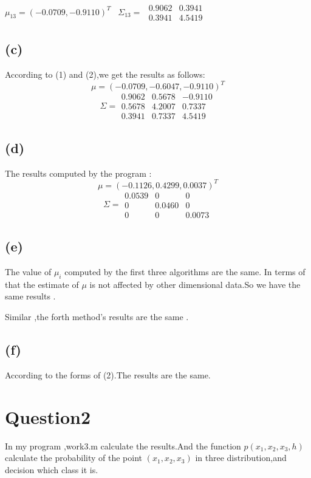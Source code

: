 \documentclass[10pt,a4paper]{article}
\begin{document}
	$\mu_{13}=(-0.0709,-0.9110)^T$ \ $\Sigma_{13}=$
	$\begin{array}{cc}
	0.9062& 0.3941  \\ 
	0.3941& 4.5419 
	\end{array} 
	$
	\subsection{(c)}
	According to (1) and (2),we get the results as follows:
	\begin{equation*}
	\mu=(-0.0709,-0.6047,-0.9110)^T
	\end{equation*}
	\begin{equation*}
	\Sigma=\begin{array}{ccc}
	0.9062& 0.5678  & -0.9110  \\ 
	0.5678& 4.2007 & 0.7337  \\ 
	0.3941& 0.7337  &4.5419 
	\end{array} 
	\end{equation*}
	\subsection{(d)}
	The results computed by the program :
	\begin{equation*}
	\mu=(-0.1126,0.4299,0.0037)^T
	\end{equation*}
	\begin{equation*}
	\Sigma=\begin{array}{ccc}
	0.0539& 0  & 0 \\ 
	0& 0.0460  & 0  \\ 
	0& 0 & 0.0073 
	\end{array} 
	\end{equation*}
	\subsection{(e)}
	The value of $\mu_i$ computed by the first three algorithms are the same.
	In terms of that the estimate of $\mu $ is not affected by other dimensional data.So we have the same results .
	
	Similar ,the forth method's results are the same .
	\subsection{(f)}
	According to the forms of (2).The results are the same.
\section{Question2}
In my program ,work3.m calculate the results.And the function $p(x_1,x_2,x_3,h)$ calculate the probability of  the point
 $(x_1,x_2,x_3)$ in three distribution,and decision which class it is.
\end{document}
